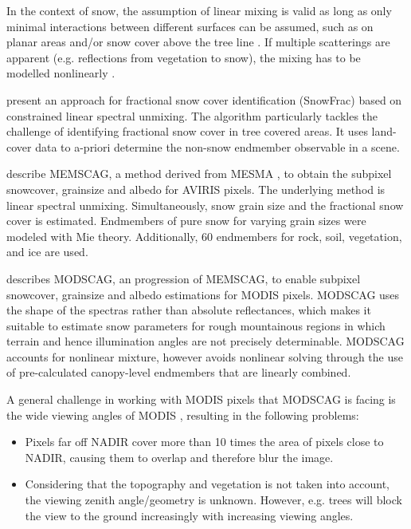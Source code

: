 \documentclass[letterpaper, parskip=half]{scrartcl}
\begin{document}
In the context of snow, the assumption of linear mixing is valid as long as only minimal interactions between different surfaces can be assumed, such as on planar areas and/or snow cover above the tree line \citep{Painter2009, Dozier2004}. If multiple scatterings are apparent (e.g. reflections from vegetation to snow), the mixing has to be modelled nonlinearly \citep{Roberts1993}.

\cite{Vikhamar2003} present an approach for fractional snow cover identification (SnowFrac) based on constrained linear spectral unmixing. The algorithm particularly tackles the challenge of identifying fractional snow cover in tree covered areas. It uses land-cover data to a-priori determine the non-snow endmember observable in a scene.

\cite{Painter2003} describe \gls{MEMSCAG}, a method derived from \gls{MESMA} \citep{Roberts1998}, to obtain the subpixel snowcover, grainsize and albedo for \gls{AVIRIS} pixels. The underlying method is linear spectral unmixing. Simultaneously, snow grain size and the fractional snow cover is estimated. Endmembers of pure snow for varying grain sizes were modeled with Mie theory. Additionally, 60 endmembers for rock, soil, vegetation, and ice are used.

\Cite{Painter2009} describes \gls{MODSCAG}, an progression of \gls{MEMSCAG}, to enable subpixel snowcover, grainsize and albedo estimations for \gls{MODIS} pixels. \gls{MODSCAG} uses the shape of the spectras rather than absolute reflectances, which makes it suitable to estimate snow parameters for rough mountainous regions in which terrain and hence illumination angles are not precisely determinable. \gls{MODSCAG} accounts for nonlinear mixture, however avoids nonlinear solving through the use of pre-calculated canopy-level endmembers that are linearly combined.

A general challenge in working with \gls{MODIS} pixels that \gls{MODSCAG} is facing is the wide viewing angles of \gls{MODIS} \citep{Dozier2009, Dozier2008, Liu2008}, resulting in the following problems:
\begin{itemize}
 \item Pixels far off NADIR cover more than 10 times the area of pixels close to NADIR, causing them to overlap and therefore blur the image.
 \item Considering that the topography and vegetation is not taken into account, the viewing zenith angle/geometry is unknown. However, e.g. trees will block the view to the ground increasingly with increasing viewing angles.
\end{itemize}
\end{document}
